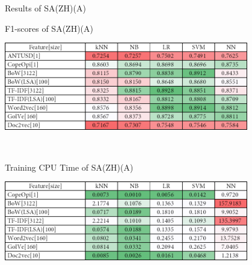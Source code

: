 \caption{Results of SA(ZH)(A)}
\label{tab:sa_zh_a}
\centering
\begin{subtable}{\textwidth}
	\centering
	\caption{F1-scores of SA(ZH)(A)}
	\includegraphics[width=0.8\textwidth]{./figure/02A1.png}
\end{subtable}\\[1em]
\begin{subtable}{\textwidth}
	\centering
	\caption{Training CPU Time of SA(ZH)(A)}
	\includegraphics[width=0.8\textwidth]{./figure/02A1t.png}
\end{subtable}
